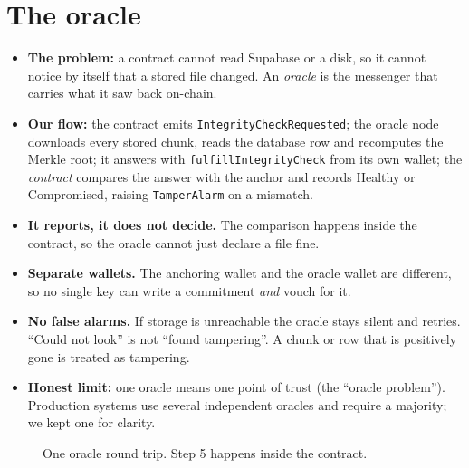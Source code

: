 \documentclass[10pt,a4paper]{article}
\newcommand{\code}[1]{\texttt{#1}}
\begin{document}
\section{The oracle}
\begin{itemize}
  \item \textbf{The problem:} a contract cannot read Supabase or a disk, so it cannot notice by itself that a stored file changed.
        An \emph{oracle} is the messenger that carries what it saw back on-chain.
  \item \textbf{Our flow:} the contract emits \code{IntegrityCheckRequested}; the oracle node downloads every stored chunk, reads
        the database row and recomputes the Merkle root; it answers with \code{fulfillIntegrityCheck} from its own wallet; the
        \emph{contract} compares the answer with the anchor and records Healthy or Compromised, raising \code{TamperAlarm} on a mismatch.
  \item \textbf{It reports, it does not decide.} The comparison happens inside the contract, so the oracle cannot just declare a file fine.
  \item \textbf{Separate wallets.} The anchoring wallet and the oracle wallet are different, so no single key can write a
        commitment \emph{and} vouch for it.
  \item \textbf{No false alarms.} If storage is unreachable the oracle stays silent and retries. ``Could not look'' is not
        ``found tampering''. A chunk or row that is positively gone is treated as tampering.
  \item \textbf{Honest limit:} one oracle means one point of trust (the ``oracle problem''). Production systems use several
        independent oracles and require a majority; we kept one for clarity.
\end{itemize}

\begin{figure}[!ht]
\centering
{}
\caption{One oracle round trip. Step 5 happens inside the contract.}
\end{figure}
\end{document}
